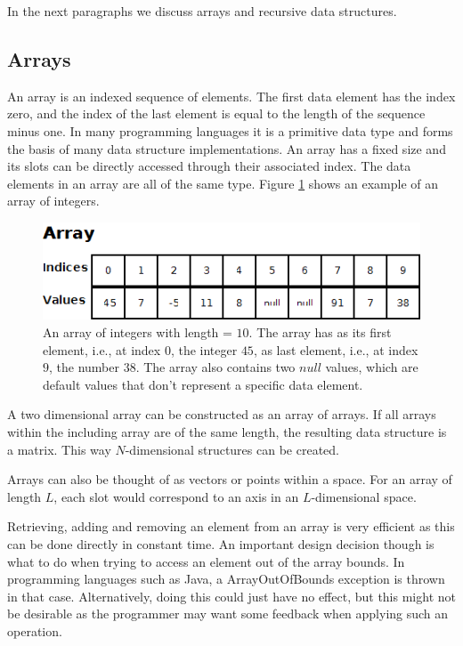 In the next paragraphs we discuss arrays and recursive data structures.


\subsection{Arrays}

An array is an indexed sequence of elements. The first data element has the index zero, and the index of the last element is equal to the length of the sequence minus one. In many programming languages it is a primitive data type and forms the basis of many data structure implementations. An array has a fixed size and its slots can be directly accessed through their associated index. The data elements in an array are all of the same type. Figure \ref{fig:array} shows an example of an array of integers.

\begin{figure}
	\begin{center}		
		\includegraphics[width=0.6\columnwidth]{img/programming-fundamentals/array}
		\caption{An array of integers with length = $10$. The array has as its first element, i.e., at index $0$, the integer $45$, as last element, i.e., at index $9$, the number $38$. The array also contains two $null$ values, which are default values that don't represent a specific data element.}
		\label{fig:array}
	\end{center}
\end{figure}

A two dimensional array can be constructed as an array of arrays. If all arrays within the including array are of the same length, the resulting data structure is a matrix. This way $N$-dimensional structures can be created.

Arrays can also be thought of as vectors or points within a space. For an array of length $L$, each slot would correspond to an axis in an $L$-dimensional space.

Retrieving, adding and removing an element from an array is very efficient as this can be done directly in constant time. An important design decision though is what to do when trying to access an element out of the array bounds. In programming languages such as Java, a ArrayOutOfBounds exception is thrown in that case. Alternatively, doing this could just have no effect, but this might not be desirable as the programmer may want some feedback when applying such an operation.

